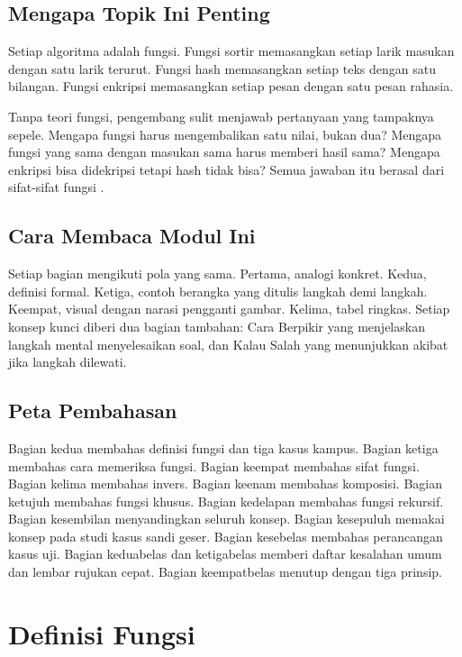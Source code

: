 \documentclass[11pt,a4paper]{article}
\begin{document}
\subsection{Mengapa Topik Ini Penting}

Setiap algoritma adalah fungsi. Fungsi sortir memasangkan setiap larik masukan dengan satu larik terurut. Fungsi hash memasangkan setiap teks dengan satu bilangan. Fungsi enkripsi memasangkan setiap pesan dengan satu pesan rahasia.

Tanpa teori fungsi, pengembang sulit menjawab pertanyaan yang tampaknya sepele. Mengapa fungsi harus mengembalikan satu nilai, bukan dua? Mengapa fungsi yang sama dengan masukan sama harus memberi hasil sama? Mengapa enkripsi bisa didekripsi tetapi hash tidak bisa? Semua jawaban itu berasal dari sifat-sifat fungsi \cite{rosen}.

\subsection{Cara Membaca Modul Ini}

Setiap bagian mengikuti pola yang sama. Pertama, analogi konkret. Kedua, definisi formal. Ketiga, contoh berangka yang ditulis langkah demi langkah. Keempat, visual dengan narasi pengganti gambar. Kelima, tabel ringkas. Setiap konsep kunci diberi dua bagian tambahan: Cara Berpikir yang menjelaskan langkah mental menyelesaikan soal, dan Kalau Salah yang menunjukkan akibat jika langkah dilewati.

\subsection{Peta Pembahasan}

Bagian kedua membahas definisi fungsi dan tiga kasus kampus. Bagian ketiga membahas cara memeriksa fungsi. Bagian keempat membahas sifat fungsi. Bagian kelima membahas invers. Bagian keenam membahas komposisi. Bagian ketujuh membahas fungsi khusus. Bagian kedelapan membahas fungsi rekursif. Bagian kesembilan menyandingkan seluruh konsep. Bagian kesepuluh memakai konsep pada studi kasus sandi geser. Bagian kesebelas membahas perancangan kasus uji. Bagian keduabelas dan ketigabelas memberi daftar kesalahan umum dan lembar rujukan cepat. Bagian keempatbelas menutup dengan tiga prinsip.

\section{Definisi Fungsi}
\end{document}
